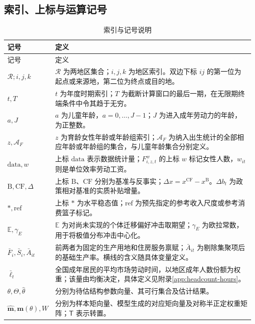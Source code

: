 \documentclass[UTF8,a4paper,zihao=-4,fontset=windows]{ctexart}
\numberwithin{equation}{section}
\newcommand{\E}{\mathbb E}
\newcommand{\B}{\mathrm B}
\newcommand{\CF}{\mathrm{CF}}
\begin{document}
\subsection{索引、上标与运算记号}
\small
\begin{longtable}{L{0.25\textwidth}L{0.65\textwidth}}
\caption{索引与记号说明}\label{tab:notation-conventions}\\
\toprule
记号 & 定义\\
\midrule
\endfirsthead
\toprule
记号 & 定义\\
\midrule
\endhead
\bottomrule
\endfoot
$\mathcal R;i,j,k$ & $\mathcal R$ 为两地区集合；$i,j,k$ 为地区索引。双边下标 $ij$ 的第一位为起点或来源地，第二位为终点或目的地。\\
$t,T$ & $t$ 为年度时期索引；$T$ 为截断计算窗口的最后一期，在无限期终端条件中令其趋于无穷。\\
$a,J$ & $a$ 为儿童年龄，$a=0,\ldots,J-1$；$J$ 为进入成年劳动力的年龄，为正整数。\\
$z,\mathcal A_F$ & $z$ 为育龄女性年龄或年龄组索引；$\mathcal A_F$ 为纳入出生统计的全部相应年龄或年龄组的集合，与儿童年龄集合分别定义。\\
$\mathrm{data},w$ & 上标 $\mathrm{data}$ 表示数据统计量；$F^w_{i,z,t}$ 的上标 $w$ 标记女性人数，$w_{it}$ 则是单位效率劳动工资。\\
$\B,\CF,\Delta$ & 上标 $\B$、$\CF$ 分别为基准与反事实；$\Delta x=x^{\CF}-x^{\B}$。$\Delta b_t$ 为政策相对基准的实质补贴增量。\\
$*,\mathrm{ref}$ & 上标 $*$ 为水平稳态值；$\mathrm{ref}$ 为预先指定的参考收入尺度或参考消费篮子标记。\\
$\E,\gamma_E$ & $\E$ 为对尚未实现的个体迁移偏好冲击取期望；$\gamma_E$ 为欧拉常数，用于将极值分布冲击中心化。\\
$\bar F_i,\bar S_i,\bar A_{it}$ & 前两者为固定的生产用地和住房服务禀赋；$\bar A_{it}$ 为剔除集聚项后的基础生产率。横线的含义随具体变量定义。\\
$\bar\ell_t$ & 全国成年居民的平均市场劳动时间，以地区成年人数份额为权重；该量由均衡决定，具体定义见附录\ref{app:headcount-hours}。\\
$\theta,\Theta,\widehat\theta$ & 分别为待估结构参数向量、其可行集合及估计结果。\\
$\widehat{\bm m},\bm m(\theta),W$ & 分别为样本矩向量、模型生成的对应矩向量及对称半正定权重矩阵；$\mathsf T$ 表示转置。\\
\end{longtable}
\normalsize
\end{document}
